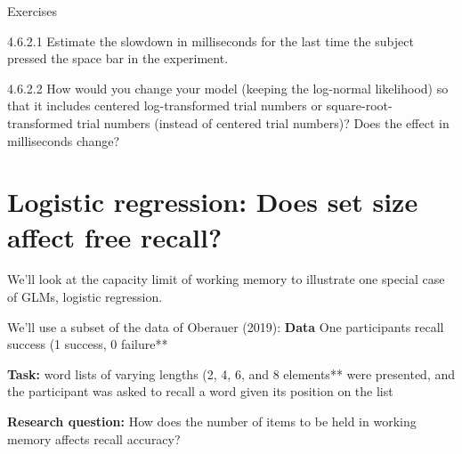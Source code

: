 \documentclass[12pt,ignorenonframetext,aspectratio=169]{beamer}
\begin{document}
\begin{frame}

\begin{block}{\color{blue} Exercises}

4.6.2.1 Estimate the slowdown in milliseconds for the last time the subject pressed the space bar in the experiment.

4.6.2.2 How would you change your model (keeping the log-normal likelihood) so that it includes centered log-transformed trial numbers or square-root-transformed trial numbers (instead of centered trial numbers)? Does the effect in milliseconds change?

\end{block}

\end{frame}

\hypertarget{sec:logistic}{%
\section{Logistic regression: Does set size affect free recall?}\label{sec:logistic}}

We'll look at the capacity limit of working memory to illustrate one special case of GLMs, logistic regression.

We'll use a subset of the data of Oberauer (2019):
\textbf{Data}
One participants recall success (1 success, 0 failure**

\textbf{Task:}
word lists of varying lengths (2, 4, 6, and 8 elements** were presented, and the participant was asked to recall a word given its position on the list

\textbf{Research question:}
How does the number of items to be held in working memory affects recall accuracy?
\end{document}

